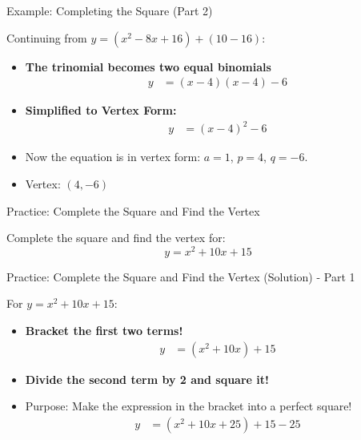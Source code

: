 \documentclass[aspectratio=169]{beamer}
\begin{document}
\begin{frame}{Example: Completing the Square (Part 2)}
    \begin{tcolorbox}[colback=lightgray,colframe=accent,title=Example: $y = x^2 - 8x + 10$ (Cont.)]
        \footnotesize
        Continuing from $y = (x^2 - 8x + 16) + (10 - 16)$:
        \begin{itemize}
            \item \textbf{The trinomial becomes two equal binomials}
                \begin{align*}
                    y &= (x-4)(x-4) - 6
                \end{align*}
            \item \textbf{Simplified to Vertex Form:}
                \begin{align*}
                    y &= (x-4)^2 - 6
                \end{align*}
            \item Now the equation is in vertex form: $a=1$, $p=4$, $q=-6$.
            \item Vertex: $(4,-6)$
        \end{itemize}
    \end{tcolorbox}
\end{frame}

\begin{frame}{Practice: Complete the Square and Find the Vertex}
    \begin{tcolorbox}[colback=lightgray,colframe=primary,title=Problem]
        \footnotesize
        Complete the square and find the vertex for: 
        \[ y = x^2 + 10x + 15 \]
    \end{tcolorbox}
\end{frame}

\begin{frame}{Practice: Complete the Square and Find the Vertex (Solution) - Part 1}
    \begin{tcolorbox}[colback=lightgray,colframe=accent,title=Solution - Part 1]
        \footnotesize
        For $y = x^2 + 10x + 15$:
        \begin{itemize}
            \item \textbf{Bracket the first two terms!}
                \begin{align*}
                    y &= (x^2 + 10x) + 15
                \end{align*}
            \item \textbf{Divide the second term by 2 and square it!}
                \item Purpose: Make the expression in the bracket into a perfect square!
                \begin{align*}
                    y &= (x^2 + 10x + 25) + 15 - 25
                \end{align*}
        \end{itemize}
    \end{tcolorbox}
\end{frame}
\end{document}
